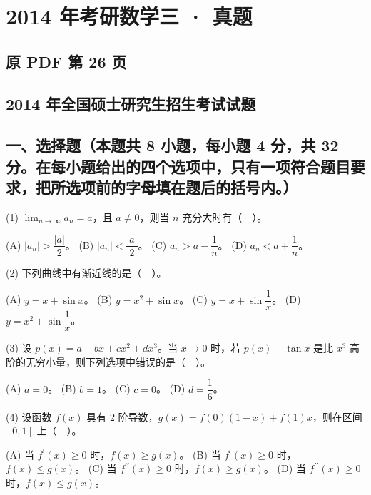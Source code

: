 \documentclass[UTF8,12pt]{ctexart}
\begin{document}
\section*{2014 年考研数学三 · 真题}
\subsection*{原 PDF 第 26 页}

\subsection*{2014 年全国硕士研究生招生考试试题}

\subsection*{一、选择题（本题共 8 小题，每小题 4 分，共 32 分。在每小题给出的四个选项中，只有一项符合题目要求，把所选项前的字母填在题后的括号内。）}

(1) \(\displaystyle \lim_{n\to\infty}a_n=a\)，且 \(\displaystyle a\ne0\)，则当 \(\displaystyle n\) 充分大时有（　）。


(A) \(\displaystyle |a_n|>\dfrac{\displaystyle |a|}{\displaystyle 2}\)。 (B) \(\displaystyle |a_n|<\dfrac{\displaystyle |a|}{\displaystyle 2}\)。 (C) \(\displaystyle a_n>a-\dfrac{\displaystyle 1}{\displaystyle n}\)。 (D) \(\displaystyle a_n<a+\dfrac{\displaystyle 1}{\displaystyle n}\)。


(2) 下列曲线中有渐近线的是（　）。


(A) \(\displaystyle y=x+\sin x\)。 (B) \(\displaystyle y=x^2+\sin x\)。 (C) \(\displaystyle y=x+\sin\dfrac{\displaystyle 1}{\displaystyle x}\)。 (D) \(\displaystyle y=x^2+\sin\dfrac{\displaystyle 1}{\displaystyle x}\)。


(3) 设 \(\displaystyle p(x)=a+bx+cx^2+dx^3\)。当 \(\displaystyle x\to0\) 时，若 \(\displaystyle p(x)-\tan x\) 是比 \(\displaystyle x^3\) 高阶的无穷小量，则下列选项中错误的是（　）。


(A) \(\displaystyle a=0\)。 (B) \(\displaystyle b=1\)。 (C) \(\displaystyle c=0\)。 (D) \(\displaystyle d=\dfrac{\displaystyle 1}{\displaystyle 6}\)。


(4) 设函数 \(\displaystyle f(x)\) 具有 2 阶导数，\(\displaystyle g(x)=f(0)(1-x)+f(1)x\)，则在区间 \(\displaystyle [0,\allowbreak 1]\) 上（　）。


(A) 当 \(\displaystyle f^{\prime}(x)\geq0\) 时，\(\displaystyle f(x)\geq g(x)\)。 (B) 当 \(\displaystyle f^{\prime}(x)\geq0\) 时，\(\displaystyle f(x)\leq g(x)\)。 (C) 当 \(\displaystyle f^{\prime\prime}(x)\geq0\) 时，\(\displaystyle f(x)\geq g(x)\)。 (D) 当 \(\displaystyle f^{\prime\prime}(x)\geq0\) 时，\(\displaystyle f(x)\leq g(x)\)。
\end{document}
